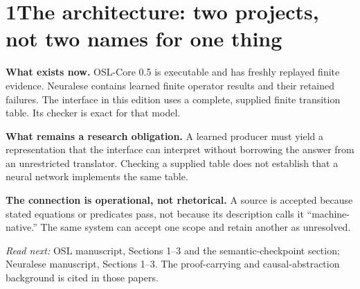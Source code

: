 \documentclass[11pt]{article}
\begin{document}
\KomorebiCover
{}



\section*{1\quad The architecture: two projects, not two names for one thing}
\begin{center}
\end{center}
\textbf{What exists now.} OSL-Core 0.5 is executable and has freshly replayed finite evidence. Neuralese contains learned finite operator results and their retained failures. The interface in this edition uses a complete, supplied finite transition table. Its checker is exact for that model.

\textbf{What remains a research obligation.} A learned producer must yield a representation that the interface can interpret without borrowing the answer from an unrestricted translator. Checking a supplied table does not establish that a neural network implements the same table.

\begin{scopebox}
\textbf{The connection is operational, not rhetorical.} A source is accepted because stated equations or predicates pass, not because its description calls it ``machine-native.'' The same system can accept one scope and retain another as unresolved.
\end{scopebox}
\textit{Read next:} OSL manuscript, Sections 1--3 and the semantic-checkpoint section; Neuralese manuscript, Sections 1--3. The proof-carrying and causal-abstraction background is cited in those papers.
\clearpage
\end{document}
